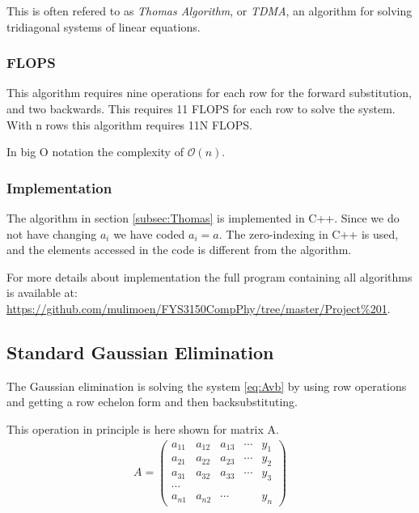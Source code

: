 \documentclass[11pt,a4paper,english]{article}
\numberwithin{equation}{section}
\newcommand{\bigO}[1]{\mathcal{O}\left( #1 \right)}
\begin{document}
This is often refered to as \emph{Thomas Algorithm}, or \emph{TDMA}, an algorithm for solving tridiagonal systems of linear equations. 

\subsubsection{FLOPS}
This algorithm requires nine operations for each row for the forward substitution,
and two backwards. This requires 11 FLOPS for each row to solve the system.
With n rows this algorithm requires 11N FLOPS.

In big O notation the complexity of $\bigO{n}$.

\subsubsection{Implementation}

The algorithm in section \ref{subsec:Thomas} is implemented in C++.
Since we do not have changing $a_i$ we have coded $a_i = a$.
The zero-indexing in C++ is used, and the elements accessed in the code
is different from the algorithm.

For more details about implementation the full program containing all algorithms is available at: \url{https://github.com/mulimoen/FYS3150CompPhy/tree/master/Project\%201}. 

\subsection{Standard Gaussian Elimination}

The Gaussian elimination is solving the system \eqref{eq:Avb} by using 
row operations and getting a row echelon form and then backsubstituting.

This operation in principle is here shown for matrix A.
\begin{gather}
A = \begin{pmatrix}
    a_{11} & a_{12} & a_{13} & \cdots & y_1\\
    a_{21} & a_{22} & a_{23} & \cdots& y_2\\
    a_{31} & a_{32} & a_{33} & \cdots & y_3\\
    \cdots \\
    a_{n1} & a_{n2} & \cdots & & y_n
    \end{pmatrix}
\end{gather}
\end{document}
